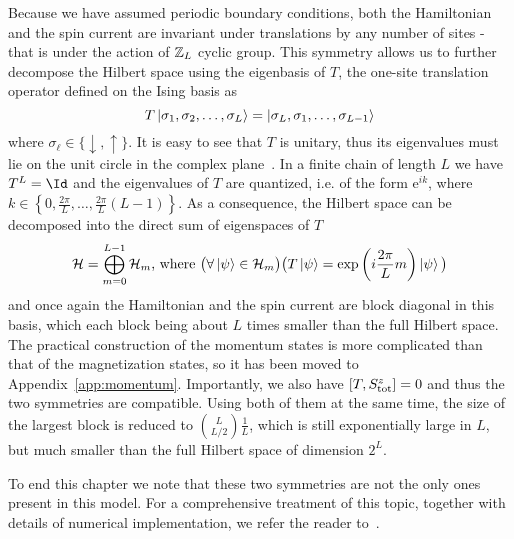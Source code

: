 Because we have assumed periodic boundary conditions, both the Hamiltonian and the spin current
are invariant under translations by any number of sites - that is under the action of \(\mathbb{Z}_L\) cyclic group.
This symmetry allows us to further decompose the Hilbert space
using the eigenbasis of \(T\), the one-site translation operator defined on the Ising basis as
\begin{equation}
    T \ket{\sigma_1,\sigma_2,\ldots,\sigma_L} = \ket{\sigma_L,\sigma_1,\ldots,\sigma_{L-1}}
\end{equation}
where \(\sigma_{\ell} \in \{\downarrow, \uparrow\}\). It is easy to see that \(T\) is unitary,
thus its eigenvalues must lie on the unit circle in the complex plane~\autocite{Horn2012}.
In a finite chain of length \(L\) we have \(T^L = \Id\) and the eigenvalues of \(T\) are
quantized, i.e. of the form \(\mathrm{e}^{i k}\), where \(k \in \left\{0,\frac{2\pi}{L},\ldots,\frac{2\pi}{L}(L-1)\right\}\).
As a consequence, the Hilbert space can be decomposed into the direct sum of eigenspaces of \(T\)
\begin{equation}
    \mathcal{H} = \bigoplus_{m=0}^{L-1} \mathcal{H}_m \text{, where } \big(\forall \ket{\psi} \in \mathcal{H}_m \big) \big(T \ket{\psi} = \exp\left({i \frac{2\pi}{L}m}\right) \ket{\psi}\big)
\end{equation}
and once again the Hamiltonian and the spin current are block diagonal in this basis, which each block being
about \(L\) times smaller than the full Hilbert space.
The practical construction of the momentum states is more complicated than that of the magnetization states,
so it has been moved to Appendix~\ref{app:momentum}.
Importantly, we also have \(\comm{T}{\Sz_{\mathrm{tot}}}=0\) and thus the two symmetries are compatible.
Using both of them at the same time, the size of the largest block is reduced to \(\binom{L}{L/2}\frac{1}{L}\), which is
still exponentially large in \(L\), but much smaller than the full Hilbert space of dimension \(2^L\).

To end this chapter we note that these two symmetries are not the only ones present in this model.
For a comprehensive treatment of this topic, together with details of numerical implementation, we refer the reader to~\textcite{Sandvik2010}.
